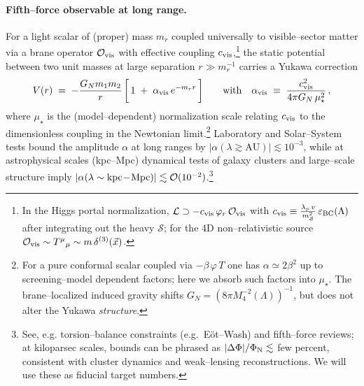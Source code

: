 \documentclass[10pt]{article}
\theoremstyle{definition}
\theoremstyle{plain}
\begin{document}
\paragraph{Fifth–force observable at long range.}\label{par:uom-main-102}
For a light scalar of (proper) mass $m_r$ coupled universally to visible–sector matter via a brane operator
$\mathcal{O}_{\rm vis}$ with effective coupling $c_{\rm vis}$,\footnote{In the Higgs portal normalization,
$\mathcal{L}\supset -c_{\rm vis}\,\varphi_r\,\mathcal O_{\rm vis}$ with $c_{\rm vis}\equiv \frac{\lambda_p\,v}{m_{\mathcal S}^2}\,\varepsilon_{\rm BC}(\Lambda)$
after integrating out the heavy $\mathcal S$; for the 4D non–relativistic source $\mathcal O_{\rm vis}\sim T^\mu{}_\mu\sim m\,\delta^{(3)}(\vec x)$.}
the static potential between two unit masses at large separation $r\gg m_r^{-1}$ carries a Yukawa correction
\begin{equation}
V(r)\;=\;-\frac{G_N m_1 m_2}{r}\,\bigg[\,1\;+\;\alpha_{\rm vis}\,e^{-m_r r}\,\bigg]
\qquad\text{with}\quad
\alpha_{\rm vis}\;\equiv\;\frac{c_{\rm vis}^2}{4\pi G_N\,\mu_{\star}^2}\,,
\label{eq:V-Yuk}
\end{equation}
where $\mu_\star$ is the (model–dependent) normalization scale relating $c_{\rm vis}$ to the dimensionless coupling
in the Newtonian limit.\footnote{For a pure conformal scalar coupled via $-\beta\,\varphi\,T$ one has
$\alpha\simeq 2\beta^2$ up to screening–model dependent factors; here we absorb such factors into $\mu_\star$.
The brane–localized induced gravity shifts $G_N=(8\pi M_4^{-2}(\Lambda))^{-1}$, but does not alter the Yukawa \emph{structure}.}
Laboratory and Solar–System tests bound the amplitude $\alpha$ at long ranges by $|\alpha(\lambda\!\gtrsim\!\mathrm{AU})|\lesssim 10^{-3}$,
while at astrophysical scales (kpc–Mpc) dynamical tests of galaxy clusters and large–scale structure imply
$|\alpha(\lambda\sim{\rm kpc\!-\!Mpc})|\lesssim {\cal O}(10^{-2})$.\footnote{See, e.g. torsion–balance constraints
(e.g.\ E\"ot–Wash) and fifth–force reviews; at kiloparsec scales, bounds can be phrased as $|\Delta \Phi|/\Phi_{\rm N}\lesssim$ few percent,
consistent with cluster dynamics and weak–lensing reconstructions. We will use these as fiducial target numbers.}
\end{document}
